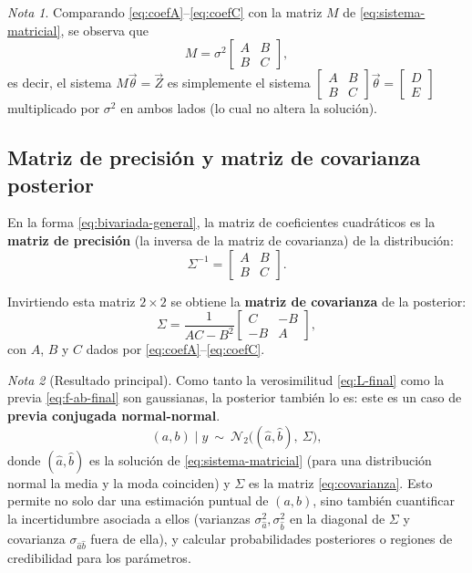 \documentclass[11pt]{article}
\theoremstyle{remark}
\newtheorem*{nota}{Nota}
\begin{document}
\begin{nota}
Comparando \eqref{eq:coefA}--\eqref{eq:coefC} con la matriz $M$ de
\eqref{eq:sistema-matricial}, se observa que
\[
M=\sigma^2\begin{bmatrix}A&B\\B&C\end{bmatrix},
\]
es decir, el sistema $M\vec\theta=\vec Z$ es simplemente el sistema
$\begin{bmatrix}A&B\\B&C\end{bmatrix}\vec\theta=\begin{bmatrix}D\\E\end{bmatrix}$
multiplicado por $\sigma^2$ en ambos lados (lo cual no altera la solución).
\end{nota}

\subsection{Matriz de precisión y matriz de covarianza posterior}

En la forma \eqref{eq:bivariada-general}, la matriz de coeficientes
cuadráticos es la \textbf{matriz de precisión} (la inversa de la matriz de
covarianza) de la distribución:
\begin{equation}
\Sigma^{-1} = \begin{bmatrix} A & B \\ B & C\end{bmatrix}.
\label{eq:precision}
\end{equation}

Invirtiendo esta matriz $2\times2$ se obtiene la \textbf{matriz de
covarianza} de la posterior:
\begin{equation}
\Sigma = \frac{1}{AC-B^2}\begin{bmatrix} C & -B \\ -B & A\end{bmatrix},
\label{eq:covarianza}
\end{equation}
con $A$, $B$ y $C$ dados por \eqref{eq:coefA}--\eqref{eq:coefC}.

\begin{nota}[Resultado principal]
Como tanto la verosimilitud \eqref{eq:L-final} como la previa
\eqref{eq:f-ab-final} son gaussianas, la posterior también lo es: este es un
caso de \textbf{previa conjugada normal-normal}.
\begin{equation}
(a,b)\mid y \ \sim\ \mathcal{N}_2\big((\hat a,\hat b),\ \Sigma\big),
\label{eq:posterior-bivariada}
\end{equation}
donde $(\hat a,\hat b)$ es la solución de \eqref{eq:sistema-matricial} (para
una distribución normal la media y la moda coinciden) y $\Sigma$ es la matriz
\eqref{eq:covarianza}. Esto permite no solo dar una estimación puntual de
$(a,b)$, sino también cuantificar la incertidumbre asociada a ellos
(varianzas $\sigma_{\hat a}^2,\sigma_{\hat b}^2$ en la diagonal de $\Sigma$ y
covarianza $\sigma_{\hat a\hat b}$ fuera de ella), y calcular probabilidades
posteriores o regiones de credibilidad para los parámetros.
\end{nota}
\end{document}
